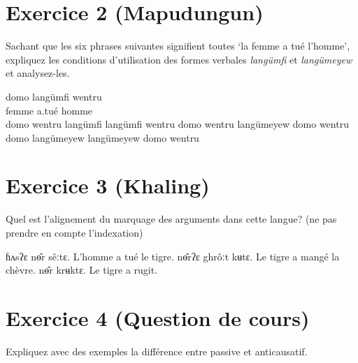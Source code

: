 \documentclass[oldfontcommands,twoside,a4paper,12pt]{article}
\begin{document}
\section*{Exercice 2 (Mapudungun)}

Sachant que les six phrases suivantes signifient toutes `la femme a tué l'homme', expliquez les conditions d'utilisation des formes  verbales \textit{langümfi} et \textit{langümeyew} et analysez-les.

 \begin{exe}
\ex 
\gll domo langümfi wentru \\
femme a.tué homme \\
\ex 
\glt domo wentru langümfi 
\ex 
\glt langümfi wentru domo
\ex 
\glt wentru langümeyew domo
\ex 
\glt wentru domo langümeyew 
\ex 
\glt langümeyew domo wentru
\end{exe} 

\section*{Exercice 3 (Khaling)}
Quel est l'alignement du marquage des arguments dans cette langue? (ne pas prendre en compte l'indexation)
 \begin{exe}
\ex 
\glt ɦʌsʔɛ nɵ̂r sêːtɛ.
\glt L'homme a tué le tigre. 
\ex 
\glt nɵ̂rʔɛ ghrôːt kʉtɛ.
\glt Le tigre a mangé la chèvre.
\ex 
\glt nɵ̂r krʉktɛ.
\glt Le tigre a rugit.
\end{exe} 
\section*{Exercice 4 (Question de cours)}
Expliquez avec des exemples la différence entre passive et anticausatif.
\end{document}
